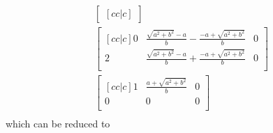 \documentclass[12pt]{article}
\begin{document}
\begin{align*}
\begin{bmatrix}[cc|c]
	\end{bmatrix} \\
	\begin{bmatrix}[cc|c]
	0                      & 
	\frac {\sqrt{a^{2} + b^{2}}-a} 
	{b} 
	- \frac {- a + \sqrt{a^{2} + b^{2}}}b 
	& 0 \\
	2                        & 
	\frac {\sqrt{a^{2} + b^{2}}-a} 
	{b}
	+ \frac {- a + \sqrt{a^{2} + b^{2}}}b 
	& 0 \\                                                                       
	\end{bmatrix} \\
	\begin{bmatrix}[cc|c]
	1                        & \frac  {a + \sqrt{a^{2} + b^{2}}}    b                                   & 0 \\
	0                        & 0                                                                        & 0 \\
	\end{bmatrix} \\
\end{align*}
which can be reduced to
    
\end{document}
